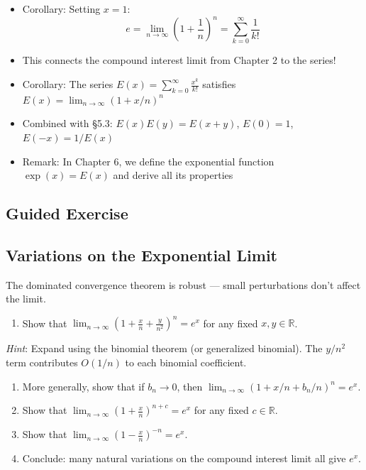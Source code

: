 \documentclass[
  10pt,
  letterpaper,
]{scrbook}
\providecommand{\tightlist}{%
  \setlength{\itemsep}{0pt}\setlength{\parskip}{0pt}}
\begin{document}
\begin{itemize}
\begin{itemize}
    \begin{itemize}
    \tightlist
    \item
      All hypotheses verified
    \item
      Therefore
      \(\lim_{n \to \infty} (1 + x/n)^n = \sum_{k=0}^{\infty} \frac{x^k}{k!}\)
    \end{itemize}
  \end{itemize}
\item
  Corollary: Setting \(x = 1\):
  \[e = \lim_{n \to \infty} \left(1 + \frac{1}{n}\right)^n = \sum_{k=0}^{\infty} \frac{1}{k!}\]
\item
  This connects the compound interest limit from Chapter 2 to the
  series!
\item
  Corollary: The series \(E(x) = \sum_{k=0}^{\infty} \frac{x^k}{k!}\)
  satisfies \(E(x) = \lim_{n \to \infty} (1 + x/n)^n\)
\item
  Combined with §5.3: \(E(x) E(y) = E(x+y)\), \(E(0) = 1\),
  \(E(-x) = 1/E(x)\)
\item
  Remark: In Chapter 6, we define the exponential function
  \(\exp(x) = E(x)\) and derive all its properties
\end{itemize}

\subsection{Guided Exercise}\label{guided-exercise-10}

\subsection{Variations on the Exponential
Limit}\label{variations-on-the-exponential-limit}

The dominated convergence theorem is robust --- small perturbations
don't affect the limit.

\begin{enumerate}
\def\labelenumi{(\alph{enumi})}
\tightlist
\item
  Show that
  \(\lim_{n \to \infty} \left(1 + \frac{x}{n} + \frac{y}{n^2}\right)^n = e^x\)
  for any fixed \(x, y \in \mathbb{R}\).
\end{enumerate}

\emph{Hint}: Expand using the binomial theorem (or generalized
binomial). The \(y/n^2\) term contributes \(O(1/n)\) to each binomial
coefficient.

\begin{enumerate}
\def\labelenumi{(\alph{enumi})}
\setcounter{enumi}{1}
\item
  More generally, show that if \(b_n \to 0\), then
  \(\lim_{n \to \infty} (1 + x/n + b_n/n)^n = e^x\).
\item
  Show that
  \(\lim_{n \to \infty} \left(1 + \frac{x}{n}\right)^{n + c} = e^x\) for
  any fixed \(c \in \mathbb{R}\).
\item
  Show that
  \(\lim_{n \to \infty} \left(1 - \frac{x}{n}\right)^{-n} = e^x\).
\item
  Conclude: many natural variations on the compound interest limit all
  give \(e^x\).
\end{enumerate}
\end{document}
